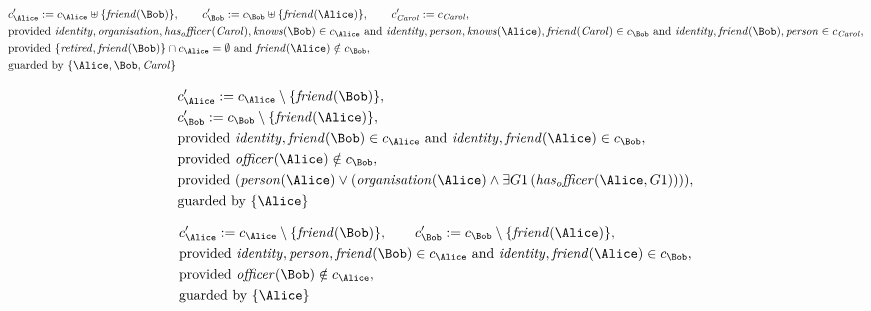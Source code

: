 \begin{align*}
&
c'_
{
\Alice
}
 := 
c_
{
\Alice
}
 \uplus 
\{
\mathit{
friend
}
(
\Bob
)
\}
, \qquad 
c'_
{
\Bob
}
 := 
c_
{
\Bob
}
 \uplus 
\{
\mathit{
friend
}
(
\Alice
)
\}
, \qquad 
c'_
{
\mathit{Carol}
}
 := 
c_
{
\mathit{Carol}
}
,\\
&
\text{provided } 
\mathit{
identity
}
,
\mathit{
organisation
}
,
\mathit{
has_officer
}
(
\mathit{Carol}
)
,
\mathit{
knows
}
(
\Bob
)
 \in c_
{
\Alice
}
 \text{ and } 
\mathit{
identity
}
,
\mathit{
person
}
,
\mathit{
knows
}
(
\Alice
)
,
\mathit{
friend
}
(
\mathit{Carol}
)
 \in c_
{
\Bob
}
 \text{ and } 
\mathit{
identity
}
,
\mathit{
friend
}
(
\Bob
)
,
\mathit{
person
}
 \in c_
{
\mathit{Carol}
}
,\\
&
\text{provided } 
\{
\mathit{
retired
}
,
\mathit{
friend
}
(
\Bob
)
\}
 \cap c_
{
\Alice
}
 = \emptyset
 \text{ and } 
\mathit{
friend
}
(
\Alice
)
 \notin c_
{
\Bob
}
,\\
&
\text{guarded by } \{
\Alice
,
\Bob
,
\mathit{Carol}
\}
\end{align*}

\begin{align*}
&
c'_
{
\Alice
}
 := 
c_
{
\Alice
}
 \setminus 
\{
\mathit{
friend
}
(
\Bob
)
\}
,\\
&
c'_
{
\Bob
}
 := 
c_
{
\Bob
}
 \setminus 
\{
\mathit{
friend
}
(
\Alice
)
\}
,\\
&
\text{provided } 
\mathit{
identity
}
,
\mathit{
friend
}
(
\Bob
)
 \in c_
{
\Alice
}
 \text{ and } 
\mathit{
identity
}
,
\mathit{
friend
}
(
\Alice
)
 \in c_
{
\Bob
}
,\\
&
\text{provided } 
\mathit{
officer
}
(
\Alice
)
 \notin c_
{
\Bob
}
,\\
&
\text{provided } 
(
\mathit{
person
}
(
\Alice
)
\lor
(
\mathit{
organisation
}
(
\Alice
)
\land
\exists 
G1
\,(
\mathit{
has_officer
}
(
\Alice
,
G1
)
)
)
)
,\\
&
\text{guarded by } \{
\Alice
\}
\end{align*}

\begin{align*}
&
c'_
{
\Alice
}
 := 
c_
{
\Alice
}
 \setminus 
\{
\mathit{
friend
}
(
\Bob
)
\}
, \qquad 
c'_
{
\Bob
}
 := 
c_
{
\Bob
}
 \setminus 
\{
\mathit{
friend
}
(
\Alice
)
\}
,\\
&
\text{provided } 
\mathit{
identity
}
,
\mathit{
person
}
,
\mathit{
friend
}
(
\Bob
)
 \in c_
{
\Alice
}
 \text{ and } 
\mathit{
identity
}
,
\mathit{
friend
}
(
\Alice
)
 \in c_
{
\Bob
}
,\\
&
\text{provided } 
\mathit{
officer
}
(
\Bob
)
 \notin c_
{
\Alice
}
,\\
&
\text{guarded by } \{
\Alice
\}
\end{align*}
